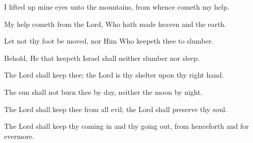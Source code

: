 I lifted up mine eyes unto the mountains, from whence cometh my help.

My help cometh from the Lord, Who hath made heaven and the earth.

Let not thy foot be moved, nor Him Who keepeth thee to slumber.

Behold, He that keepeth Israel shall neither slumber nor sleep.

The Lord shall keep thee; the Lord is thy shelter upon thy right hand.

The sun shall not burn thee by day, neither the moon by night.

The Lord shall keep thee from all evil; the Lord shall preserve thy soul.

The Lord shall keep thy coming in and thy going out, from henceforth and for evermore.

